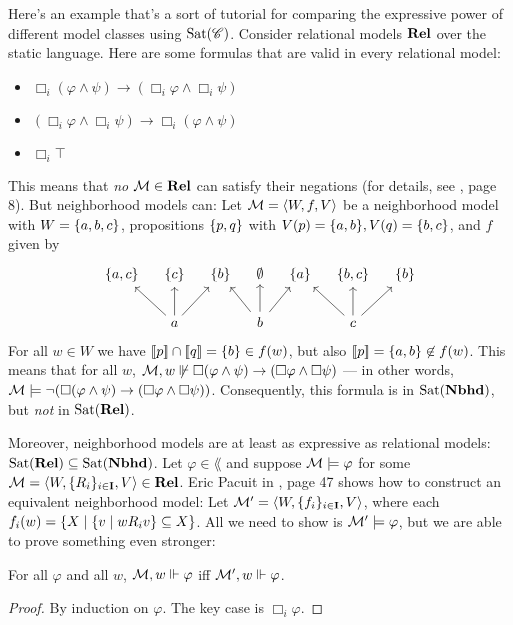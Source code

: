\documentclass[letterpaper]{article}
\begin{document}
\begin{example*}
    Here's an example that's a sort of tutorial for comparing the expressive power of different model classes using $\mathrm{Sat}( \mathscr{C} )$.  Consider relational models $\textrm{\textbf{Rel}}$ over the static language.  Here are some formulas that are valid in every relational model:
    \begin{itemize}
        \item $\Box_i(\varphi \land \psi) \to (\Box_i \varphi \land \Box_i \psi)$
        \item $(\Box_i \varphi \land \Box_i \psi) \to \Box_i(\varphi \land \psi)$
        \item $\Box_i \top$
    \end{itemize}
    This means that \emph{no} $\mathcal{M} \in \textrm{\textbf{Rel}}$ can satisfy their negations (for details, see \cite{pacuit2017neighborhood}, page 8).  But neighborhood models can: Let $\mathcal{M} = \langle W, f, V \rangle$ be a neighborhood model with $W = \{ a, b, c \}$, propositions $\{ p, q \}$ with $V(p) = \{ a, b \}, V(q) = \{ b, c \}$, and $f$ given by
    \[
    \begin{tikzcd}[column sep=1em]
        \set{a, c} & \set{c} & \set{b} & \emptyset & \set{a} & \set{b,c} & \set{b} \\
           &  a \arrow{lu} \arrow{u} \arrow{ru}  &     &  b \arrow{lu} \arrow{u} \arrow{ru}  &    &  c \arrow{lu} \arrow{u} \arrow{ru} &
    \end{tikzcd}
    \]
    For all $w \in W$ we have $[\![\mbox{\em $ p $\/}]\!] \cap [\![\mbox{\em $ q $\/}]\!] = \{ b \} \in f(w)$, but also $[\![\mbox{\em $ p $\/}]\!] = \{ a, b \} \not \in f(w)$. This means that for all $w$, $\mathcal{M}, w \not \Vdash \Box(\varphi \land \psi) \to (\Box \varphi \land \Box \psi)$ --- in other words, $\mathcal{M} \models \neg (\Box(\varphi \land \psi) \to (\Box \varphi \land \Box \psi))$.  Consequently, this formula is in $\mathrm{Sat}( \textrm{\textbf{Nbhd}} )$, but \emph{not} in $\mathrm{Sat}( \textrm{\textbf{Rel}} )$.
    
    Moreover, neighborhood models are at least as expressive as relational models: $\mathrm{Sat}( \textrm{\textbf{Rel}} ) \subseteq \mathrm{Sat}( \textrm{\textbf{Nbhd}} )$.  Let $\varphi \in \lang$ and suppose $\mathcal{M} \models \varphi$ for some $\mathcal{M} = \langle W, \{ R_i \}_{i \in \textbf{I}}, V \rangle \in \textrm{\textbf{Rel}}$.  Eric Pacuit in \cite{pacuit2017neighborhood}, page 47 shows how to construct an equivalent neighborhood model:  Let $\mathcal{M}' = \langle W, \{ f_i \}_{i \in \textbf{I}}, V \rangle$, where each $f_i(w) = \{ X \mid \{ v \mid w{R_i}v  \} \subseteq X \}$.  All we need to show is $\mathcal{M}' \models \varphi$, but we are able to prove something even stronger:
    \begin{claim*}
        For all $\varphi$ and all $w$, $\mathcal{M}, w \Vdash \varphi$ iff $\mathcal{M}', w \Vdash \varphi$.
    \end{claim*}
    \begin{proof}
        By induction on $\varphi$.  The key case is $\Box_i \varphi$.  
        

\end{proof}
\end{example*}
\end{document}
